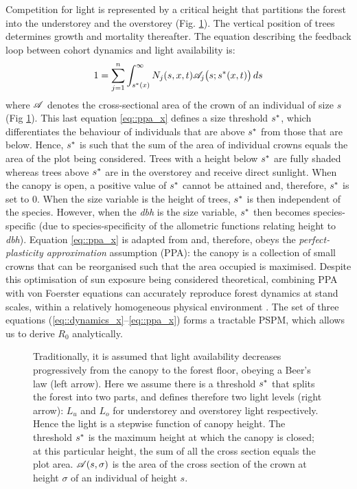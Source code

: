 Competition for light is represented by a critical height that partitions the forest into the understorey and the overstorey (Fig. \ref{fig::ppa}). The vertical position of trees determines growth and mortality thereafter. The equation describing the feedback loop between cohort dynamics and light availability is:
\begin{equation}
	1 = \sum_{j = 1}^{n} \int_{{s}^{*}(x)}^{\infty} N_j(s, x, t) \mathscr{A}_j \big(s; {s}^{*}(x, t)\big) \, ds \label{eq::ppa_x}
\end{equation}
where $ \mathscr{A} $ denotes the cross-sectional area of the crown of an individual of size $ s $ (Fig \ref{fig::ppa}). This last equation \eqref{eq::ppa_x} defines a size threshold $ {s}^{*} $, which differentiates the behaviour of individuals that are above $ {s}^{*} $ from those that are below. Hence, $ {s}^{*} $ is such that the sum of the area of individual crowns equals the area of the plot being considered. Trees with a height below $ {s}^{*} $ are fully shaded whereas trees above $ {s}^{*} $ are in the overstorey and receive direct sunlight. When the canopy is open, a positive value of $ {s}^{*} $ cannot be attained and, therefore, $ {s}^{*} $ is set to $ 0 $. When the size variable is the height of trees, $ {s}^{*} $ is then independent of the species. However, when the \textit{dbh} is the size variable, $ {s}^{*} $ then becomes species-specific (due to species-specificity of the allometric functions relating height to \textit{dbh}). Equation \eqref{eq::ppa_x} is adapted from \citet{Strigul2008} and, therefore, obeys the \textit{perfect-plasticity approximation} assumption (PPA): the canopy is a collection of small crowns that can be reorganised such that the area occupied is maximised. Despite this optimisation of sun exposure being considered theoretical, combining PPA with von Foerster equations can accurately reproduce forest dynamics at stand scales, within a relatively homogeneous physical environment \citep{Strigul2008, Purves2008}. The set of three equations (\ref{eq::dynamics_x}--\ref{eq::ppa_x}) forms a tractable PSPM, which allows us to derive $ R_0 $ analytically.

\begin{figure}
	\centering
	
	\caption{Traditionally, it is assumed that light availability decreases progressively from the canopy to the forest floor, obeying a Beer's law (left arrow). Here we assume there is a threshold $ {s}^{*} $ that splits the forest into two parts, and defines therefore two light levels (right arrow): $ L_u $ and $ L_o $ for understorey and overstorey light respectively. Hence the light is a stepwise function of canopy height. The threshold $ {s}^{*} $ is the maximum height at which the canopy is closed; at this particular height, the sum of all the cross section equals the plot area. $ \mathscr{A}(s, \sigma) $ is the area of the cross section of the crown at height $ \sigma $ of an individual of height $ s $. \label{fig::ppa}}
\end{figure}

